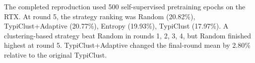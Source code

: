 The completed reproduction used 500 self-supervised pretraining epochs on the RTX. At round 5, the strategy ranking was Random (20.82\%), TypiClust+Adaptive (20.77\%), Entropy (19.93\%), TypiClust (17.97\%). A clustering-based strategy beat Random in rounds 1, 2, 3, 4, but Random finished highest at round 5. TypiClust+Adaptive changed the final-round mean by 2.80\% relative to the original TypiClust.
